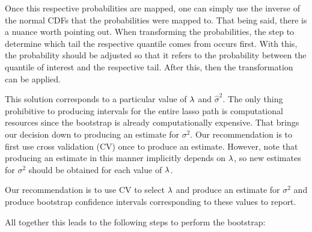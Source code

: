 Once this respective probabilities are mapped, one can simply use the inverse of the normal CDFs that the probabilities were mapped to. That being said, there is a nuance worth pointing out. When transforming the probabilities, the step to determine which tail the respective quantile comes from occurs first. With this, the probability should be adjusted so that it refers to the probability between the quantile of interest and the respective tail. After this, then the transformation can be applied.


This solution corresponds to a particular value of $\lambda$ and $\hat{\sigma}^2$. The only thing prohibitive to producing intervals for the entire lasso path is computational resources since the bootstrap is already computationally expensive. That brings our decision down to producing an estimate for $\sigma^2$. Our recommendation is to first use cross validation (CV) once to produce an estimate. However, note that producing an estimate in this manner implicitly depends on $\lambda$, so new estimates for $\sigma^2$ should be obtained for each value of $\lambda$.


Our recommendation is to use CV to select $\lambda$ and produce an estimate for $\sigma^2$ and produce bootstrap confidence intervals corresponding to these values to report.


All together this leads to the following steps to perform the bootstrap:

